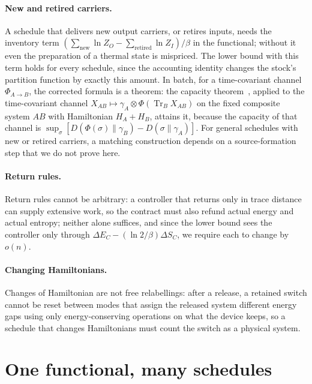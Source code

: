 \documentclass[11pt]{article}
\theoremstyle{definition}
\theoremstyle{remark}
\newcommand{\Tr}{\operatorname{Tr}}
\begin{document}
\paragraph{New and retired carriers.} A schedule that delivers new output carriers, or retires inputs, needs the inventory term $(\sum_{\mathrm{new}}\ln Z_O-\sum_{\mathrm{retired}}\ln Z_I)/\beta$ in the functional; without it even the preparation of a thermal state is mispriced. The lower bound with this term holds for every schedule, since the accounting identity changes the stock's partition function by exactly this amount. In batch, for a time-covariant channel $\Phi_{A\to B}$, the corrected formula is a theorem: the capacity theorem~\cite[Thm.~7.1]{FBB21}, applied to the time-covariant channel $X_{AB}\mapsto\gamma_A\otimes\Phi(\Tr_BX_{AB})$ on the fixed composite system $AB$ with Hamiltonian $H_A+H_B$, attains it, because the capacity of that channel is $\sup_\sigma[D(\Phi(\sigma)\|\gamma_B)-D(\sigma\|\gamma_A)]$. For general schedules with new or retired carriers, a matching construction depends on a source-formation step that we do not prove here.

\paragraph{Return rules.} Return rules cannot be arbitrary: a controller that returns only in trace distance can supply extensive work, so the contract must also refund actual energy and actual entropy; neither alone suffices, and since the lower bound sees the controller only through $\Delta E_C-(\ln2/\beta)\Delta S_C$, we require each to change by $o(n)$.

\paragraph{Changing Hamiltonians.} Changes of Hamiltonian are not free relabellings: after a release, a retained switch cannot be reset between modes that assign the released system different energy gaps using only energy-conserving operations on what the device keeps, so a schedule that changes Hamiltonians must count the switch as a physical system.

\section{One functional, many schedules}\label{sec:table}
\end{document}
